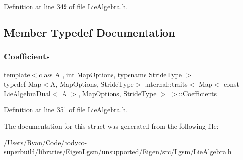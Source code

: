 Definition at line 349 of file Lie\+Algebra.\+h.



\subsection{Member Typedef Documentation}
\hypertarget{structinternal_1_1traits_3_01_map_3_01const_01_lie_algebra_dual_3_01_a_01_4_00_01_map_options_00_01_stride_type_01_4_01_4_a459b9a329ae5a1cbe01f3e0456c6eb70}{}\label{structinternal_1_1traits_3_01_map_3_01const_01_lie_algebra_dual_3_01_a_01_4_00_01_map_options_00_01_stride_type_01_4_01_4_a459b9a329ae5a1cbe01f3e0456c6eb70} 
\subsubsection{\texorpdfstring{Coefficients}{Coefficients}}
{\footnotesize\ttfamily template$<$class A , int Map\+Options, typename Stride\+Type $>$ \\
typedef Map$<$A, Map\+Options, Stride\+Type$>$ internal\+::traits$<$ Map$<$ const \hyperlink{class_lie_algebra_dual}{Lie\+Algebra\+Dual}$<$ A $>$, Map\+Options, Stride\+Type $>$ $>$\+::\hyperlink{structinternal_1_1traits_3_01_map_3_01const_01_lie_algebra_dual_3_01_a_01_4_00_01_map_options_00_01_stride_type_01_4_01_4_a459b9a329ae5a1cbe01f3e0456c6eb70}{Coefficients}}



Definition at line 351 of file Lie\+Algebra.\+h.



The documentation for this struct was generated from the following file\+:\begin{DoxyCompactItemize}
\item 
/\+Users/\+Ryan/\+Code/codyco-\/superbuild/libraries/\+Eigen\+Lgsm/unsupported/\+Eigen/src/\+Lgsm/\hyperlink{_lie_algebra_8h}{Lie\+Algebra.\+h}\end{DoxyCompactItemize}

